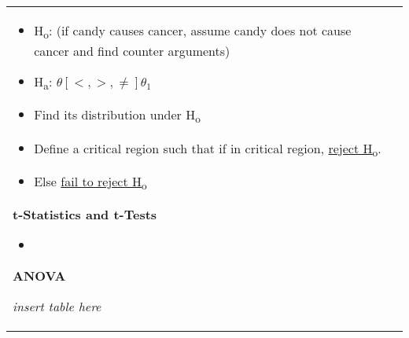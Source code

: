 \documentclass[6pt]{article}
\begin{document}
\begin{scriptsize}
\begin{tabular}{l | l}
{\begin{flushright}
\begin{itemize}
\item H\textsubscript{o}: (if candy causes cancer, assume candy does not cause cancer and find counter arguments)
\item H\textsubscript{a}: $\theta [<,>,\ne] \theta_{1}$
\item Find its distribution under H\textsubscript{o}
\item Define a critical region such that if in critical region, \underline{reject H\textsubscript{o}}.
\item Else \underline{fail to reject H\textsubscript{o}}

\end{itemize}

\begin{flushleft}
\textbf{t-Statistics and t-Tests}
\end{flushleft}
\begin{itemize}
\item <++>
\end{itemize}

\begin{flushleft}
\textbf{ANOVA}

\emph{insert table here}

\end{flushleft}
\end{flushright}
}

\end{tabular}
\end{scriptsize}
\end{document}
